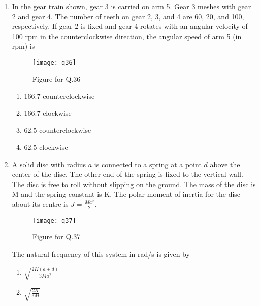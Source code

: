 \documentclass[journal,11pt,onecolumn]{IEEEtran}
\begin{document}
\begin{enumerate}[resume]
    \item In the gear train shown, gear 3 is carried on arm 5. Gear 3 meshes with gear 2 and gear 4. The number of teeth on gear 2, 3, and 4 are 60, 20, and 100, respectively. If gear 2 is fixed and gear 4 rotates with an angular velocity of 100 rpm in the counterclockwise direction, the angular speed of arm 5 (in rpm) is

          \begin{figure}[H]
              \centering
              \texttt{[image: q36]}
              \caption{Figure for Q.36}
              \label{q36}
          \end{figure}

          \begin{enumerate}

              \item 166.7 counterclockwise

              \item 166.7 clockwise

              \item 62.5 counterclockwise

              \item 62.5 clockwise

          \end{enumerate}

    \item A solid disc with radius $a$ is connected to a spring at a point $d$ above the center of the disc. The other end of the spring is fixed to the vertical wall. The disc is free to roll without slipping on the ground. The mass of the disc is M and the spring constant is K. The polar moment of inertia for the disc about its centre is $J = \frac{Ma^2}{2}$.

          \begin{figure}[H]
              \centering
              \texttt{[image: q37]}
              \caption{Figure for Q.37}
              \label{q37}
          \end{figure}

          The natural frequency of this system in rad/s is given by

          \begin{enumerate}

              \item $\sqrt{\frac{2K(a + d)}{3Ma^2}}$

              \item $\sqrt{\frac{2K}{3M}}$


\end{enumerate}
\end{enumerate}
\end{document}
